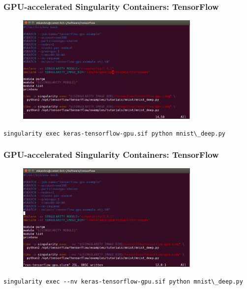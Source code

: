 \documentclass{beamer}
\begin{document}
\begin{frame}
   \frametitle{GPU-accelerated Singularity Containers: TensorFlow}
   \begin{figure}[htbp]
      \includegraphics[width=0.8\textwidth]{images/tensorflow-singularity-gpu-example-batch-job.png}
   \end{figure}
   \lstinline{singularity exec keras-tensorflow-gpu.sif python mnist\_deep.py}
\end{frame}

\begin{frame}
   \frametitle{GPU-accelerated Singularity Containers: TensorFlow}
   \begin{figure}[htbp]
      \includegraphics[width=0.8\textwidth]{images/tensorflow-singularity-gpu-example-batch-job-with--nv.png}
   \end{figure}
   \lstinline{singularity exec --nv keras-tensorflow-gpu.sif python mnist\_deep.py}
\end{frame}
\end{document}
